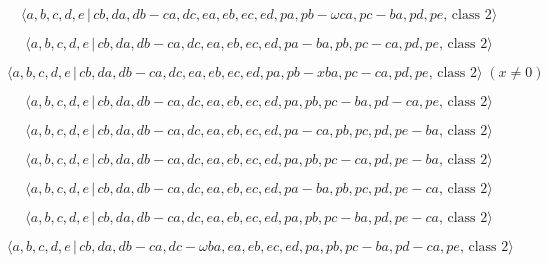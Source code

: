 \documentclass[10pt]{article}
\begin{document}
\begin{equation}
\langle a,b,c,d,e\,|\,cb,da,db-ca,dc,ea,eb,ec,ed,pa,pb-\omega
ca,pc-ba,pd,pe,\,\text{class }2\rangle  \tag{7.4661}
\end{equation}

\begin{equation}
\langle a,b,c,d,e\,|\,cb,da,db-ca,dc,ea,eb,ec,ed,pa-ba,pb,pc-ca,pd,pe,\,%
\text{class }2\rangle  \tag{7.4662}
\end{equation}

\begin{equation}
\langle a,b,c,d,e\,|\,cb,da,db-ca,dc,ea,eb,ec,ed,pa,pb-xba,pc-ca,pd,pe,\,%
\text{class }2\rangle \;(x \neq 0)  \tag{7.4663}
\end{equation}

\begin{equation}
\langle a,b,c,d,e\,|\,cb,da,db-ca,dc,ea,eb,ec,ed,pa,pb,pc-ba,pd-ca,pe,\,%
\text{class }2\rangle  \tag{7.4664}
\end{equation}

\begin{equation}
\langle a,b,c,d,e\,|\,cb,da,db-ca,dc,ea,eb,ec,ed,pa-ca,pb,pc,pd,pe-ba,\,%
\text{class }2\rangle  \tag{7.4665}
\end{equation}

\begin{equation}
\langle a,b,c,d,e\,|\,cb,da,db-ca,dc,ea,eb,ec,ed,pa,pb,pc-ca,pd,pe-ba,\,%
\text{class }2\rangle  \tag{7.4666}
\end{equation}

\begin{equation}
\langle a,b,c,d,e\,|\,cb,da,db-ca,dc,ea,eb,ec,ed,pa-ba,pb,pc,pd,pe-ca,\,%
\text{class }2\rangle  \tag{7.4667}
\end{equation}

\begin{equation}
\langle a,b,c,d,e\,|\,cb,da,db-ca,dc,ea,eb,ec,ed,pa,pb,pc-ba,pd,pe-ca,\,%
\text{class }2\rangle  \tag{7.4668}
\end{equation}

\begin{equation}
\langle a,b,c,d,e\,|\,cb,da,db-ca,dc-\omega
ba,ea,eb,ec,ed,pa,pb,pc-ba,pd-ca,pe,\,\text{class }2\rangle  \tag{7.4669}
\end{equation}
\end{document}
